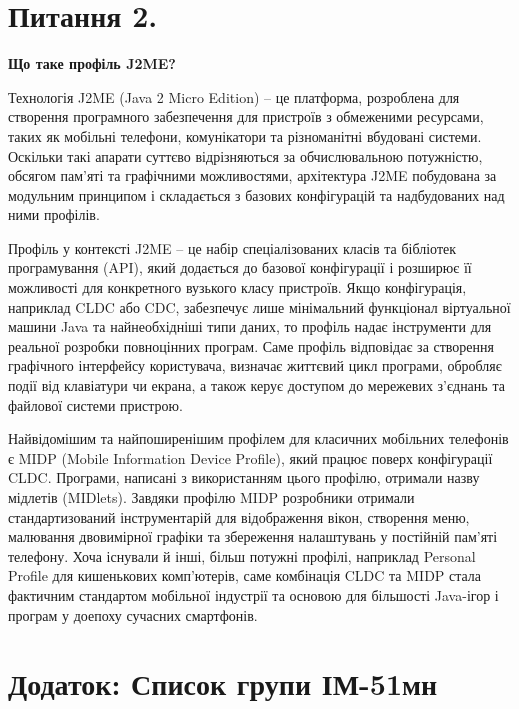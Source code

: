 \documentclass[14pt, a4paper]{extreport}
\begin{document}
	\pagebreak
	
	\section*{Питання 2.}
	
	\textbf{Що таке профіль J2ME?} 
	
	Технологія J2ME (Java 2 Micro Edition) -- це платформа, розроблена для створення програмного забезпечення для пристроїв з обмеженими ресурсами, таких як мобільні телефони, комунікатори та різноманітні вбудовані системи. Оскільки такі апарати суттєво відрізняються за обчислювальною потужністю, обсягом пам'яті та графічними можливостями, архітектура J2ME побудована за модульним принципом і складається з базових конфігурацій та надбудованих над ними профілів.
	
	Профіль у контексті J2ME -- це набір спеціалізованих класів та бібліотек програмування (API), який додається до базової конфігурації і розширює її можливості для конкретного вузького класу пристроїв. Якщо конфігурація, наприклад CLDC або CDC, забезпечує лише мінімальний функціонал віртуальної машини Java та найнеобхідніші типи даних, то профіль надає інструменти для реальної розробки повноцінних програм. Саме профіль відповідає за створення графічного інтерфейсу користувача, визначає життєвий цикл програми, обробляє події від клавіатури чи екрана, а також керує доступом до мережевих з'єднань та файлової системи пристрою.
	
	Найвідомішим та найпоширенішим профілем для класичних мобільних телефонів є MIDP (Mobile Information Device Profile), який працює поверх конфігурації CLDC. Програми, написані з використанням цього профілю, отримали назву мідлетів (MIDlets). Завдяки профілю MIDP розробники отримали стандартизований інструментарій для відображення вікон, створення меню, малювання двовимірної графіки та збереження налаштувань у постійній пам'яті телефону. Хоча існували й інші, більш потужні профілі, наприклад Personal Profile для кишенькових комп'ютерів, саме комбінація CLDC та MIDP стала фактичним стандартом мобільної індустрії та основою для більшості Java-ігор і програм у доепоху сучасних смартфонів.
	
	\pagebreak
	
	\section*{Додаток: Список групи ІМ-51мн} 
	
\end{document}
